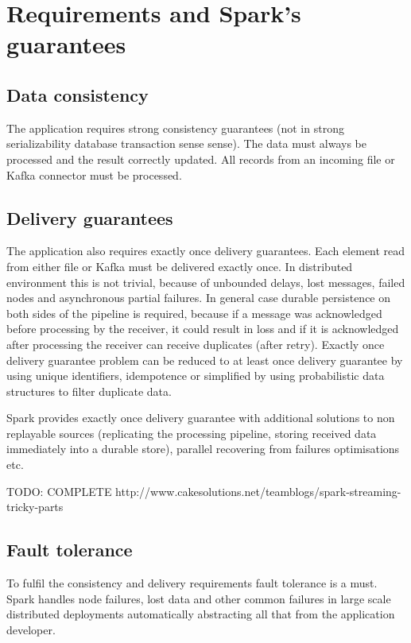 \documentclass[a4paper, 10 pt, conference]{IEEEtran}
\begin{document}
\section{Requirements and Spark's guarantees}

\subsection{Data consistency}
The application requires strong consistency guarantees (not in strong serializability database transaction sense sense). The data must always be processed and the result correctly updated. All records from an incoming file or Kafka connector must be processed. 

\subsection{Delivery guarantees}
The application also requires exactly once delivery guarantees. Each element read from either file or Kafka must be delivered exactly once. In distributed environment this is not trivial, because of unbounded delays, lost messages, failed nodes and asynchronous partial failures. In general case durable persistence on both sides of the pipeline is required, because if a message was acknowledged before processing by the receiver, it could result in loss and if it is acknowledged after processing the receiver can receive duplicates (after retry). Exactly once delivery guarantee problem can be reduced to at least once delivery guarantee by using unique identifiers, idempotence or simplified by using probabilistic data structures to filter duplicate data.

Spark provides exactly once delivery guarantee with additional solutions to non replayable sources (replicating the processing pipeline, storing received data immediately into a durable store), parallel recovering from failures optimisations etc.

TODO: COMPLETE http://www.cakesolutions.net/teamblogs/spark-streaming-tricky-parts

\subsection{Fault tolerance}
To fulfil the consistency and delivery requirements fault tolerance is a must. Spark handles node failures, lost data and other common failures in large scale distributed deployments automatically abstracting all that from the application developer.
\end{document}
